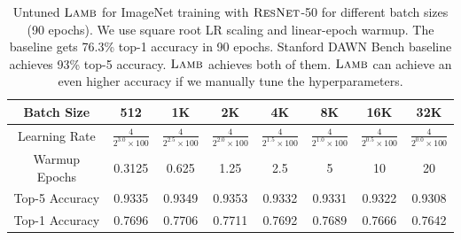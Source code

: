 \begin{table}[ht]
\renewcommand{\arraystretch}{1.3}
\caption{Untuned $\textsc{Lamb}$ for ImageNet training with $\textsc{ResNet}$-50 for different batch sizes (90 epochs). We use square root LR scaling and linear-epoch warmup. The baseline \cite{goyal2017accurate} gets 76.3\% top-1 accuracy in 90 epochs. Stanford DAWN Bench \citep{coleman2017dawnbench} baseline achieves 93\% top-5 accuracy. $\textsc{Lamb}$ achieves both of them. $\textsc{Lamb}$ can achieve an even higher accuracy if we manually tune the hyperparameters.}
\centering
\begin{tabular}{|c|c|c|c|c|c|c|c|}
\hline
Batch Size & 512 & 1K & 2K & 4K & 8K & 16K & 32K\\
\hline
\hline
Learning Rate & $\frac{4}{2^{3.0}\times100}$ & $\frac{4}{2^{2.5}\times100}$ & $\frac{4}{2^{2.0}\times100}$ & $\frac{4}{2^{1.5}\times100}$ & $\frac{4}{2^{1.0}\times100}$ & $\frac{4}{2^{0.5}\times100}$ & $\frac{4}{2^{0.0}\times100}$\\
\hline
Warmup Epochs & 0.3125 & 0.625 & 1.25 & 2.5 & 5 & 10 & 20\\
\hline
Top-5 Accuracy & 0.9335 & 0.9349 & 0.9353 & 0.9332 & 0.9331 & 0.9322 & 0.9308 \\
\hline
Top-1 Accuracy & 0.7696 & 0.7706 & 0.7711 & 0.7692 & 0.7689 & 0.7666 & 0.7642 \\
\hline
\end{tabular}
\label{table:resnet_hyper_parameters}
\end{table}